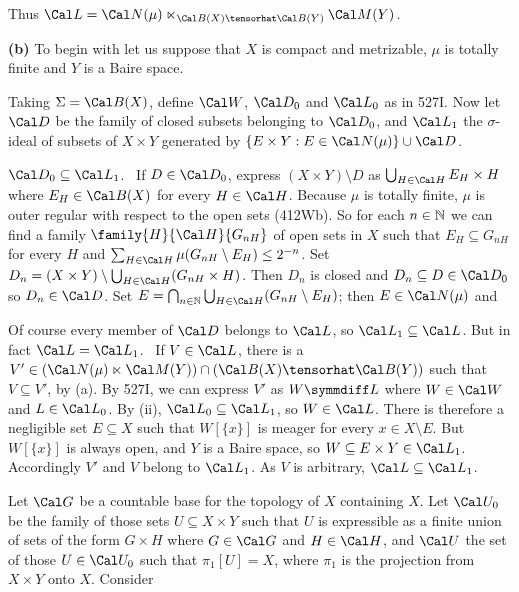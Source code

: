 {Thus $\Cal L=\Cal N(\mu)\ltimes_{\Cal B(X)\tensorhat\Cal B(Y)}\Cal M(Y)$.

\medskip

{\bf (b)} To begin with let us suppose
that $X$ is compact and metrizable, $\mu$ is totally finite and $Y$ is a
Baire space.

\medskip

Taking $\Sigma=\Cal B(X)$, define $\Cal W$, $\Cal D_0$ and $\Cal L_0$ as in 527I.
Now let $\Cal D$ be the family of closed subsets belonging to $\Cal D_0$, and
$\Cal L_1$ the $\sigma$-ideal of subsets of $X\times Y$ generated by
$\{E\times Y:E\in\Cal N(\mu)\}\cup\Cal D$.

\medskip

 $\Cal D_0\subseteq\Cal L_1$.
\Prf\ If $D\in\Cal D_0$, express $(X\times Y)\setminus D$ as
$\bigcup_{H\in\Cal H}E_H\times H$ where $E_H\in\Cal B(X)$
for every $H\in\Cal H$.   Because $\mu$ is totally finite, $\mu$ is outer
regular with respect to the open sets (412Wb).
So for each $n\in\Bbb N$ we can find a family
$\family{H}{\Cal H}{G_{nH}}$ of open sets in $X$ such that $E_H\subseteq G_{nH}$ for
every $H$ and $\sum_{H\in\Cal H}\mu(G_{nH}\setminus E_H)\le 2^{-n}$.   Set
$D_n=(X\times Y)\setminus\bigcup_{H\in\Cal H}(G_{nH}\times H)$.   Then $D_n$ is closed
and $D_n\subseteq D\in\Cal D_0$ so $D_n\in\Cal D$.   Set
$E=\bigcap_{n\in\Bbb N}\bigcup_{H\in\Cal H}(G_{nH}\setminus E_H)$;   then
$E\in\Cal N(\mu)$ and


\medskip

 Of course every member of $\Cal D$ belongs to $\Cal L$, so
$\Cal L_1\subseteq\Cal L$.   But in fact $\Cal L=\Cal L_1$.   \Prf\ If $V\in\Cal L$,
there is a $V'\in(\Cal N(\mu)\ltimes\Cal M(Y))\cap(\Cal B(X)\tensorhat\Cal B(Y))$
such that $V\subseteq V'$, by (a).   By 527I, we can
express $V'$ as $W\symmdiff L$ where $W\in\Cal W$ and $L\in\Cal L_0$.   By (ii),
$\Cal L_0\subseteq\Cal L_1$, so $W\in\Cal L$.   There is therefore a negligible set
$E\subseteq X$ such that $W[\{x\}]$ is meager for every $x\in X\setminus E$.
But $W[\{x\}]$ is always open, and $Y$ is a Baire
space, so $W\subseteq E\times Y\in\Cal L_1$.   Accordingly $V'$ and $V$ belong to
$\Cal L_1$.   As $V$ is arbitrary, $\Cal L\subseteq\Cal L_1$.\ \Qed

\medskip

 Let $\Cal G$ be a countable base for the topology of $X$ containing
$X$.   Let
$\Cal U_0$ be the family of those sets $U\subseteq X\times Y$ such that $U$
is expressible as a finite union of sets of the form $G\times H$ where $G\in\Cal G$
and $H\in\Cal H$, and $\Cal U$ the set of those $U\in\Cal U_0$ such that
$\pi_1[U]=X$, where $\pi_1$ is the projection from $X\times Y$ onto $X$.
Consider

}
